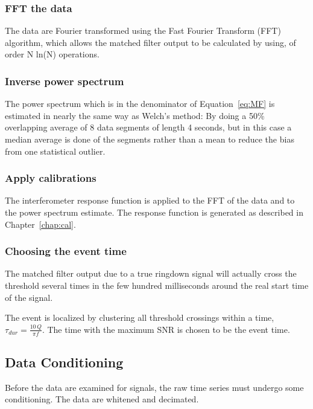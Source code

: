 \subsubsection{FFT the data}

The data are Fourier transformed using the Fast Fourier Transform (FFT)
algorithm, which allows the matched filter output to be calculated by
using, of order N ln(N) operations. 

\subsubsection{Inverse power spectrum}

The power spectrum which is in the denominator of Equation~\ref{eq:MF}
is estimated in nearly the same way as Welch's method: By doing a 50\% 
overlapping average of 8 data segments of length 4 seconds, but in
this case a median average is done of the segments rather than a mean
to reduce the bias from one statistical outlier.

\subsubsection{Apply calibrations}

The interferometer response function is applied to the FFT of the data
and to the power spectrum estimate. The response function is generated as 
described in Chapter~\ref{chap:cal}.

\subsubsection{Choosing the event time}

The matched filter output due to a true ringdown signal will actually cross
the threshold several times in the few hundred milliseconds around the
real start time of the signal. 

The event is localized  by clustering all threshold crossings 
within a time, 
$\tau_{dur} = \frac{10 \, Q}{\pi f}$. The time with the maximum SNR is chosen
to be the event time.


\subsection{Data Conditioning}

Before the data are examined for signals, the raw time series must undergo
some conditioning. The data are whitened and decimated.

